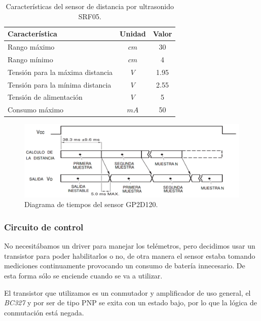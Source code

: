 \begin{table}[ht]
	\begin{center}
		\begin{tabular}{|l|c|c|}
			\hline
			Caracter\'istica & Unidad & Valor\\
			\hline
			Rango m\'aximo & $cm$ & 30 \\
			Rango m\'inimo & $cm$ & 4 \\
			Tensi\'on para la m\'axima distancia & $V$ & 1.95 \\
			Tensi\'on para la m\'inima distancia & $V$ & 2.55 \\
			Tensi\'on de alimentaci\'on & $V$ & 5 \\
			Consumo m\'aximo & $mA$ & 50 \\
			\hline
		\end{tabular}
	\end{center}
	\caption{Caracter\'isticas del sensor de distancia por ultrasonido SRF05.}
	\label{hT_gp2d120}
\end{table}

\begin{figure}[ht]
	\centering
	\includegraphics[scale=0.25]{gp2d120_pulse.png}
	\caption{Diagrama de tiempos del sensor GP2D120.}
	\label{hF_gp2d120_pulse}
\end{figure}

\subsubsection{Circuito de control}
\label{h_sensado_telemetros_circuito}

No necesit\'abamos un driver para manejar los tel\'emetros, pero decidimos usar un transistor para poder habilitarlos o no,
de otra manera el sensor estaba tomando mediciones continuamente provocando un consumo de bater\'ia innecesario.
De esta forma s\'olo se enciende cuando se va a utilizar.

El transistor que utilizamos es un conmutador y amplificador de uso general, el \emph{BC327} y por ser de tipo PNP se
exita con un estado bajo, por lo que la l\'ogica de conmutaci\'on est\'a negada.

